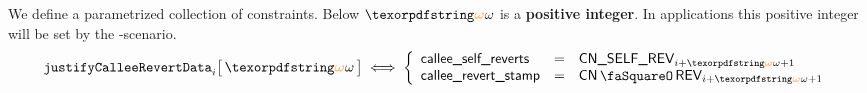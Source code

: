 We define a parametrized collection of constraints. Below $\relof$ is a \textbf{positive integer}. In applications this positive integer will be set by the -scenario.
\[
	\justifyCalleeRevertData {i}{\relof}
	\iff
	\left\{ \begin{array}{lcl}
		\locCalleeSelfReverts & = & \cnSelfRev  _{i + \relof + 1} \\
		\locCalleeRevertStamp & = & \cnRevStamp _{i + \relof + 1} \\
	\end{array} \right.
\]
